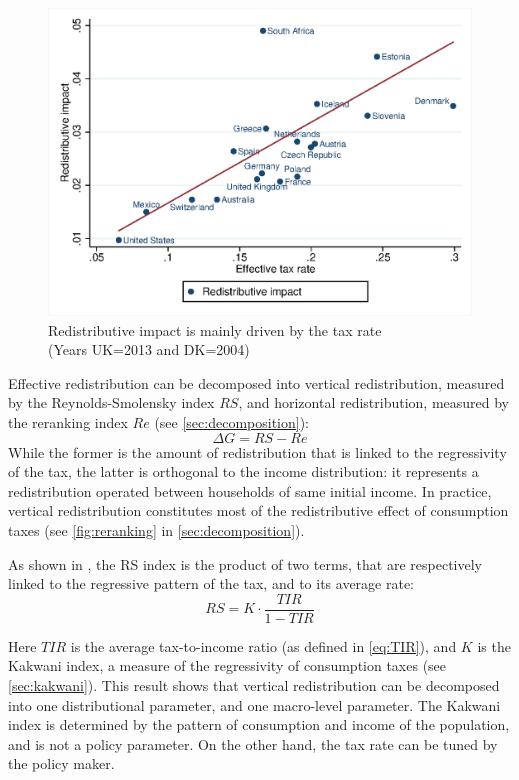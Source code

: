 \documentclass[12pt]{article}
\begin{document}
\begin{figure}
		\centering
    \includegraphics{"images/19-02 redistribution itrc"}
    \caption{Redistributive impact is mainly driven by the tax rate \\ (Years UK=2013 and DK=2004)}
    \label{fig:redis_itrc}
\end{figure}

Effective redistribution can be decomposed into vertical redistribution, measured by the Reynolds-Smolensky index $RS$, and horizontal redistribution, measured by the reranking index $Re$ (see \cref{sec:decomposition}):
\[ \Delta G = RS-Re \]
While the former is the amount of redistribution that is linked to the regressivity of the tax, the latter is orthogonal to the income distribution: it represents a redistribution operated between households of same initial income. In practice, vertical redistribution constitutes most of the redistributive effect of consumption taxes (see \cref{fig:reranking} in \cref{sec:decomposition}).

As shown in \cite{kakwani1977measurement}, the RS index is the product of two terms, that are respectively linked to the regressive pattern of the tax, and to its average rate:
\begin{equation}
    \label{equ:decomp_RS}
    RS = K \cdot \frac{TIR}{1-TIR} 
\end{equation} 

Here $TIR$ is the average tax-to-income ratio (as defined in \eqref{eq:TIR}), and $K$ is the Kakwani index, a measure of the regressivity of consumption taxes (see \cref{sec:kakwani}). This result shows that vertical redistribution can be decomposed into one distributional parameter, and one macro-level parameter. The Kakwani index is determined by the pattern of consumption and income of the population, and is not a policy parameter. On the other hand, the tax rate can be tuned by the policy maker.
\end{document}
